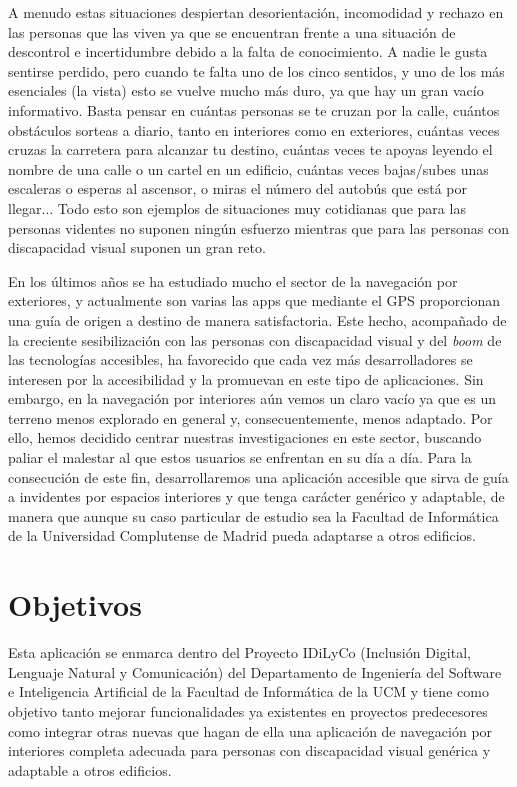 A menudo estas situaciones despiertan desorientación, incomodidad y rechazo en las personas que las viven ya que se encuentran frente a una situación de descontrol e incertidumbre debido a la falta de conocimiento. A nadie le gusta sentirse perdido, pero cuando te falta uno de los cinco sentidos, y uno de los más esenciales (la vista) esto se vuelve mucho más duro, ya que hay un gran vacío informativo. Basta pensar en cuántas personas se te cruzan por la calle, cuántos obstáculos sorteas a diario, tanto en interiores como en exteriores, cuántas veces cruzas la carretera para alcanzar tu destino, cuántas veces te apoyas leyendo el nombre de una calle o un cartel en un edificio, cuántas veces bajas/subes unas escaleras o esperas al ascensor, o miras el número del autobús que está por llegar... Todo esto son ejemplos de situaciones muy cotidianas que para las personas videntes no suponen ningún esfuerzo mientras que para las personas con discapacidad visual suponen un gran reto. 

En los últimos años se ha estudiado mucho el sector de la navegación por exteriores, y actualmente son varias las apps que mediante el GPS proporcionan una guía de origen a destino de manera satisfactoria. Este hecho, acompañado de la creciente sesibilización con las personas con discapacidad visual y del \textit{boom} de las tecnologías accesibles, ha favorecido que cada vez más desarrolladores se interesen por la accesibilidad y la promuevan en este tipo de aplicaciones. Sin embargo, en la navegación por interiores aún vemos un claro vacío ya que es un terreno menos explorado en general y, consecuentemente, menos adaptado. Por ello, hemos decidido centrar nuestras investigaciones en este sector, buscando paliar el malestar al que estos usuarios se enfrentan en su día a día. Para la consecución de este fin, desarrollaremos una aplicación accesible que sirva de guía a invidentes por espacios interiores y que tenga carácter genérico y adaptable, de manera que aunque su caso particular de estudio sea la Facultad de Informática de la Universidad Complutense de Madrid pueda adaptarse a otros edificios. 


\section{Objetivos}
\label{sec:objetivosProyecto}

Esta aplicación se enmarca dentro del Proyecto IDiLyCo (Inclusión Digital, Lenguaje Natural y Comunicación) del Departamento de
Ingeniería del Software e Inteligencia Artificial de la Facultad de Informática de la UCM y tiene
como objetivo tanto mejorar funcionalidades ya existentes en proyectos predecesores como integrar otras nuevas que hagan de ella una aplicación de navegación por interiores completa adecuada para personas con discapacidad visual genérica y adaptable a otros edificios.

